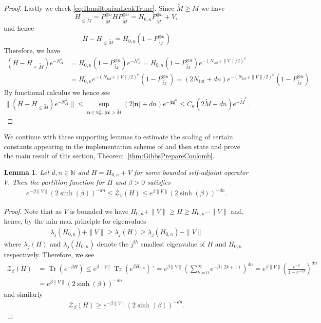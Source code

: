 \documentclass[11pt]{amsart}
\newcommand{\1}{\mathbbm{1}}
\newcommand{\Tr}{\operatorname{Tr}}
\newcommand{\N}{\mathbb{N}}
\newcommand{\Ntot}{N_{\operatorname{tot}}}
\theoremstyle{plain}
\newtheorem{lemma}[theorem]{Lemma}
\theoremstyle{definition}
\theoremstyle{remark}
\numberwithin{equation}{section}
\begin{document}
\begin{proof}
Lastly we check \eqref{eq:HamiltonianLeakTrunc}. Since $\widetilde M \ge M$ we have 
\[
H_{\le \widetilde{M}}=P_{\widetilde M}^{\otimes n}HP_{\widetilde M}^{\otimes n}=
H_{0,n}P_{\widetilde M}^{\otimes n} + V,
\]
and hence
\[
H-H_{\le \widetilde{M}}=H_{0,n}(1-P_{\widetilde M}^{\otimes n}) 
\]
Therefore, we have 
\[\begin{split}
(H-H_{\le \widetilde{M}})e^{-N_{\mathcal A}^\kappa}&=H_{0,n}(1-P_{\widetilde M}^{\otimes n})e^{-N_{\mathcal A}^\kappa}=H_{0,n}(1-P_{\widetilde M}^{\otimes n})e^{-(\Ntot+\|V\|/2)^\kappa}\\
&= H_{0,n}e^{-(\Ntot+\|V\|/2)^\kappa}(1-P_{\widetilde M}^{\otimes n})  = (2\Ntot +dn)e^{-(\Ntot+\|V\|/2)^\kappa}(1-P_{\widetilde M}^{\otimes n})
\end{split}
\]
By functional calculus we hence see
\[
\|(H-H_{\le \widetilde{M}})e^{-N_{\mathcal A}^\kappa}\|
\le  \sup_{\mathbf{n}\in\N^n_0,\,|\mathbf{n}|>\widetilde M}(2|\mathbf{n}|+dn) e^{-|\mathbf{n}|^\kappa} \le C_\kappa (2\widetilde M + dn)e^{-\widetilde M^\kappa}.
\]
\end{proof}
We continue with three supporting lemmas to estimate the scaling of certain constants appearing in the implementation scheme of \cite[Theorem~4.12 \& Corollary~4.33]{BeckerRouzeSalzmannToAppearcmp} and then state and prove the main result of this section, Theorem~\ref{thm:GibbsPrepareCoulomb}. 
\begin{lemma}
\label{lem:PartionFunctionBound}
Let $d,n\in\N$ and $H =  H_{0,n} +V$ for some bounded self-adjoint operator $V.$ Then the partition function for $H$ and $\beta >0$ satisfies
\begin{align*}
    e^{-\beta\|V\|} (2\sinh(\beta))^{-dn}\le\mathcal{Z}_\beta(H) \le e^{\beta\|V\|} (2\sinh(\beta))^{-dn}.
\end{align*}
\end{lemma}
\begin{proof}
 Note that as $V$ is bounded we have 
$H_{0,n} +\|V\|\ge H \ge H_{0,n} - \|V\|$ and, hence, by the min-max principle for eigenvalues 
\begin{align*}
    \lambda_j(H_{0,n}) + \|V\|\ge \lambda_j(H) \ge \lambda_j(H_{0,n}) - \|V\|
\end{align*}
where $\lambda_j(H)$ and $\lambda_j(H_{0,n})$ denote the $j^{th}$ smallest eigenvalue of $H$ and $H_{0,n}$ respectively. Therefore, we see
\begin{align*}
\mathcal{Z}_\beta(H) &= \Tr\left(e^{-\beta H}\right) \le e^{\beta\|V\|} \Tr\left(e^{\beta H_{0,n}}\right) ´= e^{\beta\|V\|}  \left(\sum_{k=0}^{\infty} e^{-\beta (2k+1)} \right)^{dn} =e^{\beta\|V\|} \left(\frac{e^{-\beta}}{1-e^{-2\beta}}\right)^{dn} \\&=e^{\beta\|V\|} (2\sinh(\beta))^{-dn}   
\end{align*}
and similarly 
\begin{align*}
\mathcal{Z}_\beta(H) \ge e^{-\beta\|V\|} (2\sinh(\beta))^{-dn}.
\end{align*}
\end{proof}
\end{document}
